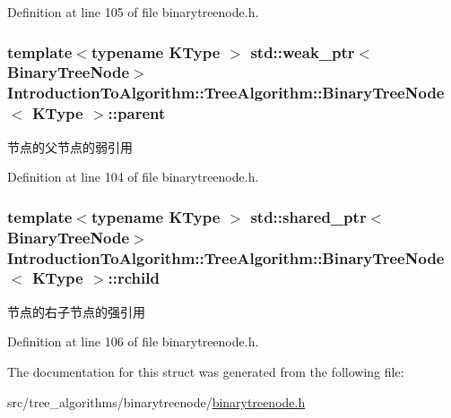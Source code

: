 Definition at line 105 of file binarytreenode.\+h.

\hypertarget{struct_introduction_to_algorithm_1_1_tree_algorithm_1_1_binary_tree_node_aa94cbc785416ba74505661baac55a9fd}{}
\subsubsection[{parent}]{\setlength{\rightskip}{0pt plus 5cm}template$<$typename K\+Type $>$ std\+::weak\+\_\+ptr$<${\bf Binary\+Tree\+Node}$>$ {\bf Introduction\+To\+Algorithm\+::\+Tree\+Algorithm\+::\+Binary\+Tree\+Node}$<$ K\+Type $>$\+::parent}\label{struct_introduction_to_algorithm_1_1_tree_algorithm_1_1_binary_tree_node_aa94cbc785416ba74505661baac55a9fd}
节点的父节点的弱引用 

Definition at line 104 of file binarytreenode.\+h.

\hypertarget{struct_introduction_to_algorithm_1_1_tree_algorithm_1_1_binary_tree_node_aaccc444db582ed362bff4e50efbc47c7}{}
\subsubsection[{rchild}]{\setlength{\rightskip}{0pt plus 5cm}template$<$typename K\+Type $>$ std\+::shared\+\_\+ptr$<${\bf Binary\+Tree\+Node}$>$ {\bf Introduction\+To\+Algorithm\+::\+Tree\+Algorithm\+::\+Binary\+Tree\+Node}$<$ K\+Type $>$\+::rchild}\label{struct_introduction_to_algorithm_1_1_tree_algorithm_1_1_binary_tree_node_aaccc444db582ed362bff4e50efbc47c7}
节点的右子节点的强引用 

Definition at line 106 of file binarytreenode.\+h.



The documentation for this struct was generated from the following file\+:\begin{DoxyCompactItemize}
\item 
src/tree\+\_\+algorithms/binarytreenode/\hyperlink{binarytreenode_8h}{binarytreenode.\+h}\end{DoxyCompactItemize}
